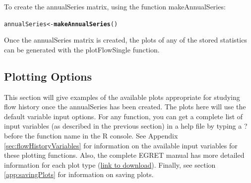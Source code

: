 \documentclass[a4paper,11pt]{article}\usepackage{graphicx, color}
\makeatletter
\newcommand{\hlfunctioncall}[1]{\textcolor[rgb]{0.501960784313725,0,0.329411764705882}{\textbf{#1}}}%
\newenvironment{kframe}{%
 \def\at@end@of@kframe{}%
 \ifinner\ifhmode%
  \def\at@end@of@kframe{\end{minipage}}%
  \begin{minipage}{\columnwidth}%
 \fi\fi%
 \def\FrameCommand##1{\hskip\@totalleftmargin \hskip-\fboxsep
 \colorbox{shadecolor}{##1}\hskip-\fboxsep
     \hskip-\linewidth \hskip-\@totalleftmargin \hskip\columnwidth}%
 \MakeFramed {\advance\hsize-\width
   \@totalleftmargin\z@ \linewidth\hsize
   \@setminipage}}%
 {\par\unskip\endMakeFramed%
 \at@end@of@kframe}
\newenvironment{knitrout}{}{} %
\makeatother
\begin{document}
To create the annualSeries matrix, using the function makeAnnualSeries:
\begin{knitrout}
\color{fgcolor}\begin{kframe}
\begin{alltt}
annualSeries <- \hlfunctioncall{makeAnnualSeries}()
\end{alltt}
\end{kframe}
\end{knitrout}


Once the annualSeries matrix is created, the plots of any of the stored statistics can be generated with the plotFlowSingle function.

\FloatBarrier

\subsection{Plotting Options}
\label{sec:plotOptions}

\FloatBarrier

This section will give examples of the available plots appropriate for studying flow history once the annualSeries has been created. The plots here will use the default variable input options.  For any function, you can get a complete list of input variables (as described in the previous section) in a help file by typing a ? before the function name in the R console. See Appendix \ref{sec:flowHistoryVariables} for information on the available input variables for these plotting functions. Also, the complete EGRET manual has more detailed information for each plot type (\href{https://github.com/USGS-R/EGRET/raw/Documentation/EGRET%2Bmanual_4.doc}{link to download}). Finally, see section \ref{app:savingPlots} for information on saving plots.
\end{document}
